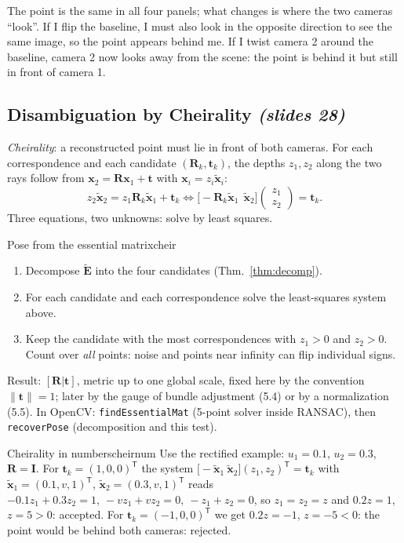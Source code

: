 \documentclass[11pt,a4paper]{article}
\newcommand{\slr}[1]{\texorpdfstring{\emph{(slides #1)}}{(slides #1)}}
\newcommand{\xt}{\tilde{\bm{x}}}    %
\newcommand{\E}{\tilde{\bm E}}
\newcommand{\norm}[1]{\lVert #1\rVert}
\newcommand{\tr}{^{\mathsf T}}
\begin{document}
\begin{intuition}
The point is the same in all four panels; what changes is where the two cameras ``look''. If I flip the baseline, I must also look in the opposite direction to see the same image, so the point appears behind me. If I twist camera 2 around the baseline, camera 2 now looks away from the scene: the point is behind it but still in front of camera 1.
\end{intuition}

\subsection{Disambiguation by Cheirality \slr{28}}
\emph{Cheirality}: a reconstructed point must lie in front of both cameras. For each correspondence and each candidate $(\bm R_k,\bm t_k)$, the depths $z_1,z_2$ along the two rays follow from $\bm x_2=\bm R\bm x_1+\bm t$ with $\bm x_i=z_i\xt_i$:
\[
z_2\xt_2=z_1\bm R_k\xt_1+\bm t_k\iff\bigl[-\bm R_k\xt_1\ \ \xt_2\bigr]\begin{pmatrix}z_1\\z_2\end{pmatrix}=\bm t_k .
\]
Three equations, two unknowns: solve by least squares.

\begin{algorithm}{Pose from the essential matrix}{cheir}
\begin{enumerate}[nosep]
\item Decompose $\E$ into the four candidates (Thm.~\ref{thm:decomp}).
\item For each candidate and each correspondence solve the least-squares system above.
\item Keep the candidate with the most correspondences with $z_1>0$ and $z_2>0$. Count over \emph{all} points: noise and points near infinity can flip individual signs.
\end{enumerate}
Result: $[\bm R|\bm t]$, metric up to one global scale, fixed here by the convention $\norm{\bm t}=1$; later by the gauge of bundle adjustment (5.4) or by a normalization (5.5).
In OpenCV: \texttt{findEssentialMat} (5-point solver inside RANSAC), then \texttt{recoverPose} (decomposition and this test).
\end{algorithm}

\begin{example}{Cheirality in numbers}{cheirnum}
Use the rectified example: $u_1=0.1$, $u_2=0.3$, $\bm R=\bm I$. For $\bm t_k=(1,0,0)\tr$ the system
$\bigl[-\xt_1\ \xt_2\bigr](z_1,z_2)\tr=\bm t_k$ with $\xt_1=(0.1,v,1)\tr$, $\xt_2=(0.3,v,1)\tr$ reads $-0.1z_1+0.3z_2=1,\ -vz_1+vz_2=0,\ -z_1+z_2=0$, so $z_1=z_2=z$ and $0.2z=1$, $z=5>0$: accepted.
For $\bm t_k=(-1,0,0)\tr$ we get $0.2z=-1$, $z=-5<0$: the point would be behind both cameras: rejected.
\end{example}
\end{document}
